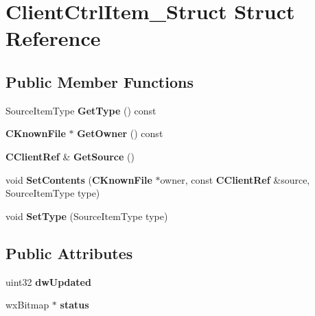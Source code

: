 \section{ClientCtrlItem\_\-Struct Struct Reference}
\label{structClientCtrlItem__Struct}
\subsection*{Public Member Functions}
\begin{DoxyCompactItemize}
\item 
SourceItemType {\bfseries GetType} () const \label{structClientCtrlItem__Struct_ae1181eb471ef9862a0f6fb8f7e0bbbb4}

\item 
{\bf CKnownFile} $\ast$ {\bfseries GetOwner} () const \label{structClientCtrlItem__Struct_a54f239f9d36bbae6bf2d7e0d2705eb75}

\item 
{\bf CClientRef} \& {\bfseries GetSource} ()\label{structClientCtrlItem__Struct_a2179af7b93a63438c38a8b075bad145a}

\item 
void {\bfseries SetContents} ({\bf CKnownFile} $\ast$owner, const {\bf CClientRef} \&source, SourceItemType type)\label{structClientCtrlItem__Struct_ae8cd2228c7cd51d417e7dcebf1e9b563}

\item 
void {\bfseries SetType} (SourceItemType type)\label{structClientCtrlItem__Struct_a712597582a2f23a1f1eabfd9927e1c95}

\end{DoxyCompactItemize}
\subsection*{Public Attributes}
\begin{DoxyCompactItemize}
\item 
uint32 {\bfseries dwUpdated}\label{structClientCtrlItem__Struct_af15c74b7bfa1c1d4e38e3367b81f0c08}

\item 
wxBitmap $\ast$ {\bfseries status}\label{structClientCtrlItem__Struct_a6382c1b4f2ed779ff79c82e00acec4d3}

\end{DoxyCompactItemize}
